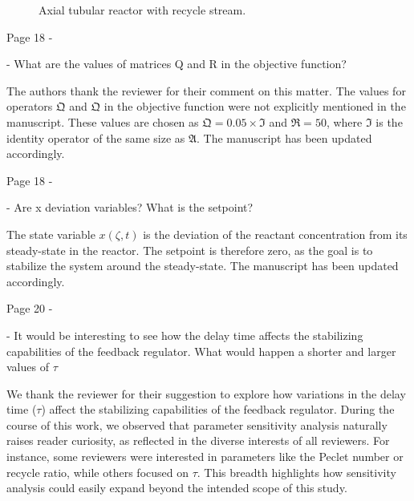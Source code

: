 \documentclass[11pt,answers]{exam}
\begin{document}
\begin{questions}
\begin{figure}[!htbp]
\begin{tikzpicture}
        \end{tikzpicture}
        \caption{Axial tubular reactor with recycle stream.}
        \label{fig:reactor}
    \end{figure}

    \question Page 18 - 

    - What are the values of matrices Q and R in the objective function?

    \begin{solutionorbox} \label{comment:1_12}
        The authors thank the reviewer for their comment on this matter. The values for operators $\mathfrak{Q}$ and $\mathfrak{Q}$ in the objective function were not explicitly mentioned in the manuscript. These values are chosen as $\mathfrak{Q} = 0.05 \times \mathfrak{I}$ and $\mathfrak{R} = 50$, where $\mathfrak{I}$ is the identity operator of the same size as $\mathfrak{A}$. The manuscript has been updated accordingly.
    \end{solutionorbox}


    \question Page 18 - 

    - Are x deviation variables? What is the setpoint?

    \begin{solutionorbox} \label{comment:1_13}
        The state variable $x(\zeta,t)$ is the deviation of the reactant concentration from its steady-state in the reactor. The setpoint is therefore zero, as the goal is to stabilize the system around the steady-state. The manuscript has been updated accordingly.
    \end{solutionorbox}


    \question Page 20 - 

    - It would be interesting to see how the delay time affects the stabilizing capabilities of the feedback regulator. What would happen a shorter and larger values of $\tau$

    \begin{solutionorbox} \label{comment:1_14}
        We thank the reviewer for their suggestion to explore how variations in the delay time (\(\tau\)) affect the stabilizing capabilities of the feedback regulator. During the course of this work, we observed that parameter sensitivity analysis naturally raises reader curiosity, as reflected in the diverse interests of all reviewers. For instance, some reviewers were interested in parameters like the Peclet number or recycle ratio, while others focused on \(\tau\). This breadth highlights how sensitivity analysis could easily expand beyond the intended scope of this study.


\end{solutionorbox}
\end{questions}
\end{document}
